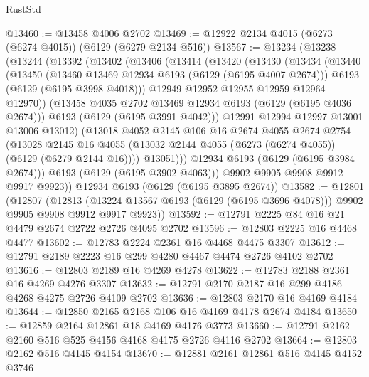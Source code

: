 \begin{lexlean}{RustStd}
\begin{coremodule}
@13460 := @13458 @4006 @2702
@13469 := @12922 @2134 @4015 (@6273 (@6274 @4015)) (@6129 (@6279 @2134 @516))
@13567 := @13234
    (@13238
      (@13244
        (@13392
          (@13402
            (@13406
              (@13414
                (@13420
                  (@13430
                    (@13434
                      (@13440
                        (@13450
                          (@13460 @13469 @12934 @6193 (@6129 (@6195 @4007 @2674)))
                          @6193
                          (@6129 (@6195 @3998 @4018)))
                        @12949
                        @12952
                        @12955
                        @12959
                        @12964
                        @12970))
                    (@13458 @4035 @2702 @13469 @12934 @6193 (@6129 (@6195 @4036 @2674)))
                    @6193
                    (@6129 (@6195 @3991 @4042)))
                  @12991
                  @12994
                  @12997
                  @13001
                  @13006
                  @13012)
                (@13018
                  @4052
                  @2145
                  @106
                  @16
                  @2674
                  @4055
                  @2674
                  @2754
                  (@13028
                    @2145
                    @16
                    @4055
                    (@13032 @2144 @4055 (@6273 (@6274 @4055)) (@6129 (@6279 @2144 @16))))
                  @13051)))
            @12934
            @6193
            (@6129 (@6195 @3984 @2674)))
          @6193
          (@6129 (@6195 @3902 @4063)))
        @9902
        @9905
        @9908
        @9912
        @9917
        @9923))
    @12934
    @6193
    (@6129 (@6195 @3895 @2674))
@13582 := @12801
    (@12807
      (@12813
        (@13224 @13567 @6193 (@6129 (@6195 @3696 @4078)))
        @9902
        @9905
        @9908
        @9912
        @9917
        @9923))
@13592 := @12791 @2225 @84 @16 @21 @4479 @2674 @2722 @2726 @4095 @2702
@13596 := @12803 @2225 @16 @4468 @4477
@13602 := @12783 @2224 @2361 @16 @4468 @4475 @3307
@13612 := @12791 @2189 @2223 @16 @299 @4280 @4467 @4474 @2726 @4102 @2702
@13616 := @12803 @2189 @16 @4269 @4278
@13622 := @12783 @2188 @2361 @16 @4269 @4276 @3307
@13632 := @12791 @2170 @2187 @16 @299 @4186 @4268 @4275 @2726 @4109 @2702
@13636 := @12803 @2170 @16 @4169 @4184
@13644 := @12850 @2165 @2168 @106 @16 @4169 @4178 @2674 @4184
@13650 := @12859 @2164 @12861 @18 @4169 @4176 @3773
@13660 := @12791 @2162 @2160 @516 @525 @4156 @4168 @4175 @2726 @4116 @2702
@13664 := @12803 @2162 @516 @4145 @4154
@13670 := @12881 @2161 @12861 @516 @4145 @4152 @3746

\end{coremodule}
\end{lexlean}
